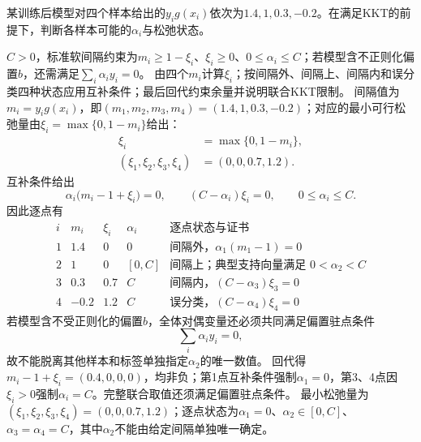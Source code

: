 \label{struct:V3-C02-CH18}
\label{struct:V3-C02-CH32}
\begin{example}[一维软间隔状态判定]\label{exm:V3-C02-kkt-state}
某训练后模型对四个样本给出的$y_ig(x_i)$依次为$1.4,1,0.3,-0.2$。在满足KKT的前提下，判断各样本可能的$\alpha_i$与松弛状态。

\label{struct:V3-C02-CH33}
\end{example}
{\let\needspace\Needspace\setlength{\smallskipamount}{3pt}}
\begin{solution}
\SolGiven $C>0$，标准软间隔约束为$m_i\ge1-\xi_i$、$\xi_i\ge0$、$0\le\alpha_i\le C$；若模型含不正则化偏置$b$，还需满足$\sum_i\alpha_i y_i=0$。
\SolPlan 由四个$m_i$计算$\xi_i$；按间隔外、间隔上、间隔内和误分类四种状态应用互补条件；最后回代约束余量并说明联合KKT限制。
\SolDerive
间隔值为$m_i=y_i g(x_i)$，即$(m_1,m_2,m_3,m_4)=(1.4,1,0.3,-0.2)$；对应的最小可行松弛量由$\xi_i=\max\{0,1-m_i\}$给出：
\[
\begin{aligned}
\xi_i&=\max\{0,1-m_i\},\\
(\xi_1,\xi_2,\xi_3,\xi_4)&=(0,0,0.7,1.2).
\end{aligned}
\]
互补条件给出
\[
\alpha_i\bigl(m_i-1+\xi_i\bigr)=0,
\qquad (C-\alpha_i)\xi_i=0,
\qquad 0\leq\alpha_i\leq C.
\]
因此逐点有
\[
\begin{array}{c|c|c|c|l}
i&m_i&\xi_i&\alpha_i&\text{逐点状态与证书}\\ \hline
1&1.4&0&0&\text{间隔外，}\alpha_1(m_1-1)=0\\
2&1&0&[0,C]&\text{间隔上；典型支持向量满足 }0<\alpha_2<C\\
3&0.3&0.7&C&\text{间隔内，}(C-\alpha_3)\xi_3=0\\
4&-0.2&1.2&C&\text{误分类，}(C-\alpha_4)\xi_4=0
\end{array}
\]
若模型含不受正则化的偏置$b$，全体对偶变量还必须共同满足偏置驻点条件
\[
\sum_i\alpha_i y_i=0,
\]
故不能脱离其他样本和标签单独指定$\alpha_2$的唯一数值。
\SolCheck 回代得$m_i-1+\xi_i=(0.4,0,0,0)$，均非负；第1点互补条件强制$\alpha_1=0$，第3、4点因$\xi_i>0$强制$\alpha_i=C$。完整联合取值还须满足偏置驻点条件。
\SolAnswer 最小松弛量为$(\xi_1,\xi_2,\xi_3,\xi_4)=(0,0,0.7,1.2)$；逐点状态为$\alpha_1=0$、$\alpha_2\in[0,C]$、$\alpha_3=\alpha_4=C$，其中$\alpha_2$不能由给定间隔单独唯一确定。
\end{solution}

